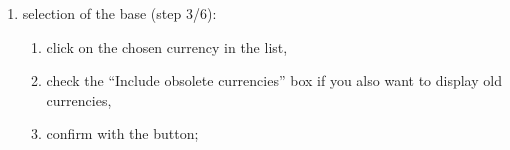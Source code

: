 \begin{enumerate}
\Attention{}: the Grisbi developers recommend that you do not use the  option for the following reasons:
\begin{itemize}
	\item there is no method for recovering an encrypted file whose password has been lost;
	\item For some unknown reason, using this option on \gls{Windows} can render the accounts file completely unusable.
\end{itemize} 
However, if you use it, it is advisable to make regular back-ups of the unencrypted file.

		\begin{enumerate}[resume]		%
			\item select the  with one of the four buttons%
				\begin{itemize}	
				\item[\textopenbullet] \enquote{dd/mm/yyyy} for \enquote{day/month/year},
				\item[\textopenbullet] \enquote{mm/dd/yyyy} for \enquote{month/day/year},
				\item[\textopenbullet] \enquote{dd.mm.yyyy} for \enquote{day.month.year},
				\item[\textopenbullet] \enquote{yyyy-mm-dd} for \enquote{year-month-day},
				\end{itemize}
			\item choose the decimal  and the thousands from the drop-down lists,%
			\item fill in the address (optional),%
			\item confirm with the  button;%
		\end{enumerate}

	\item selection of the base  (step 3/6):%
		\begin{enumerate} 
			\item click on the chosen currency in the list,%
		\item check the \enquote{Include obsolete currencies} box if you also want to display old currencies,%
		\item confirm with the  button;%
	\end{enumerate}


\end{enumerate}
